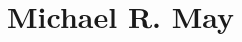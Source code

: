 \documentclass[12pt]{article}
\begin{document}
\thispagestyle{firststyle}

% 
\section*{Michael R. May}

\end{document}
